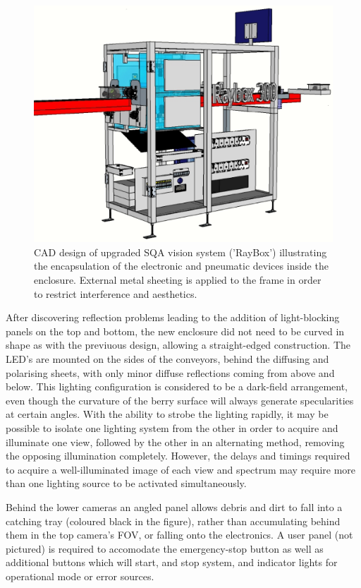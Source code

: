 \documentclass[fleqn,twoside,12pt]{report}
\begin{document}
\begin{figure}[h]
	\centering
	\includegraphics[width=.8\linewidth]{SQA_v2.png}
	\caption{CAD design of upgraded SQA vision system ('RayBox') illustrating the encapsulation of the electronic and pneumatic devices inside the enclosure. External metal sheeting is applied to the frame in order to restrict interference and aesthetics.}
	\label{fig:SQA_v2}
\end{figure}%


After discovering reflection problems leading to the addition of light-blocking panels on the top and bottom, the new enclosure did not need to be curved in shape as with the previuous design, allowing a straight-edged construction. The LED's are mounted on the sides of the conveyors, behind the diffusing and polarising sheets, with only minor diffuse reflections coming from above and below. This lighting configuration is considered to be a dark-field arrangement, even though the curvature of the berry surface will always generate specularities at certain angles. With the ability to strobe the lighting rapidly, it may be possible to isolate one lighting system from the other in order to acquire and illuminate one view, followed by the other in an alternating method, removing the opposing illumination completely. However, the delays and timings required to acquire a well-illuminated image of each view and spectrum may require more than one lighting source to be activated simultaneously.

Behind the lower cameras an angled panel allows debris and dirt to fall into a catching tray (coloured black in the figure), rather than accumulating behind them in the top camera's FOV, or falling onto the electronics. A user panel (not pictured) is required to accomodate the emergency-stop button as well as additional buttons which will start, and stop system, and indicator lights for operational mode or error sources.
\end{document}
